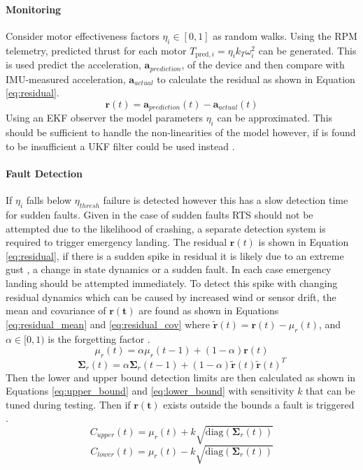 \paragraph{Monitoring}
Consider motor effectiveness factors $\eta_i \in [0,1]$ as random walks. Using the \gls{RPM} telemetry, predicted thrust for each motor $T_{\text{pred},i} = \eta_i k_T \omega_i^2$ can be generated. This is used predict the acceleration, $\mathbf{a}_{prediction}$, of the device and then compare with IMU-measured acceleration,  $\mathbf{a}_{actual}$ to calculate the residual as shown in Equation \ref{eq:residual}. 
\begin{equation}\label{eq:residual}
    \mathbf{r}(t) = \mathbf{a}_{prediction}(t) - \mathbf{a}_{actual}(t)
\end{equation}
Using an \gls{EKF} observer the model parameters $\eta_i$ can be approximated. This should be sufficient to handle the non-linearities of the model however, if is found to be insufficient a \gls{UKF} filter could be used instead \cite{WAN2000}.
\paragraph{Fault Detection}
If $\eta_i$ falls below $\eta_{thresh}$ failure is detected however this has a slow detection time for sudden faults. Given in the case of sudden faults \gls{RTS} should not be attempted due to the likelihood of crashing, a separate detection system is required to trigger emergency landing. The residual $\mathbf{r}(t)$ is shown in Equation \ref{eq:residual}, if there is a sudden spike in residual it is likely due to an extreme gust , a change in state dynamics or a sudden fault. In each case emergency landing should be attempted immediately. To detect this spike with changing residual dynamics which can be caused by increased wind or sensor drift, the mean and covariance of $\mathbf{r(t)}$ are found as shown in Equations \ref{eq:residual_mean} and \ref{eq:residual_cov} where  $\mathbf{\tilde{r}}(t) = \mathbf{r}(t) - \mu_r(t)$, and $\alpha \in [0,1)$ is the forgetting factor \cite{roberts1959}.
\begin{equation}\label{eq:residual_mean}
     \mu_r(t) = \alpha \mu_r(t-1) + (1 - \alpha) \mathbf{r}(t)
\end{equation}
\begin{equation}\label{eq:residual_cov}
    \mathbf{\Sigma}_r(t) = \alpha \mathbf{\Sigma}_r(t-1) + (1 - \alpha) \mathbf{\tilde{r}}(t)\mathbf{\tilde{r}}(t)^T
\end{equation}
Then the lower and upper bound detection limits are then calculated as shown in Equations \ref{eq:upper_bound} and \ref{eq:lower_bound} with sensitivity $k$ that can be tuned during testing. Then if $\mathbf{r(t)}$ exists outside the bounds a fault is triggered \cite{Perry2010}.
\begin{equation}\label{eq:upper_bound}
    C_{upper}(t) = \mu_r(t) + k \sqrt{\text{diag}(\mathbf{\Sigma}_r(t))} 
\end{equation}
\begin{equation}\label{eq:lower_bound}
    C_{lower}(t) =  \mu_r(t) - k \sqrt{\text{diag}(\mathbf{\Sigma}_r(t))}
\end{equation}
